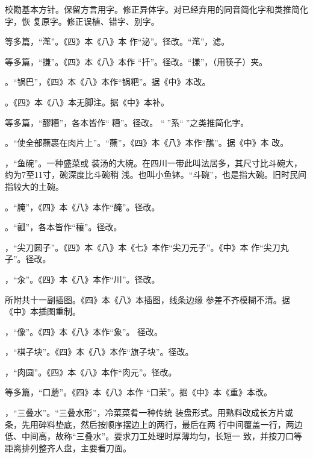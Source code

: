 校勘基本方针。保留方言用字。修正异体字。对已经弃用的同音简化字和类推简化字，恢
复原字。修正误植、错字、别字。

\null%

等多篇，“滗”。《四》本《八》本
作“泌”。径改。“滗”，滤。

等多篇，“搛”。《四》本《八》本作
“扦”。径改。“搛”，（用筷子）夹。

。“锅巴”，《四》本《八》本作“锅粑”。据《中》本改。

。《四》本《八》本无脚注{\footnotesize{}}。据《中》本补。

等多篇，“醪糟”，各本皆作“𰪿糟”。径改。
“𰪿”系“𫃑”之类推简化字。

。“使全部蘸裹在肉片上”。“蘸”，《四》本《八》本作“醮”。据《中》本
改。

，“鱼碗”。一种盛菜或
装汤的大碗。在四川一带此叫法居多，其尺寸比斗碗大，约为7至11寸，碗深度比斗碗稍
浅。也叫小鱼钵。“斗碗”，也是指大碗。旧时民间指较大的土碗。

。“腌”，《四》本《八》本作“醃”。径改。

。“瓤”，各本皆作“穰”。径改。

，“尖刀圆子”。《四》本《八》本《七》本作“尖刀元子”。《中》本
作“尖刀丸子”。径改。

，“汆”。《四》本《八》本作“川”。径改。

所附共十一副插图。《四》本《八》本插图，线条边缘
参差不齐模糊不清。据《中》本插图重制。

，“像”。\null《四》本《八》本作“象”。
径改。

，“棋子块”。《四》本《八》本作“旗子块”。径改。

，“肉圆”。《四》本《八》本作“肉元”。径改。

等多篇，“口蘑”。《四》本《八》本作
“口茉”。据《中》本《重》本改。

，“三叠水”。“三叠水形”，冷菜菜肴一种传统
装盘形式。用熟料改成长方片或条，先用碎料垫底，然后按顺序摆边上的两行，最后在两
行中间覆盖一行，两边低、中间高，故称“三叠水”。要求刀工处理时厚薄均匀，长短一
致，并按刀口等距离排列整齐人盘，主要看刀面。

